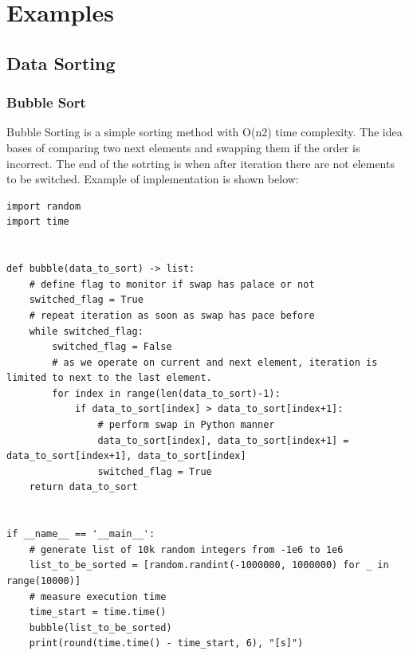 \documentclass{article}
\begin{document}
\newpage
\section{Examples}
\subsection{Data Sorting}
\subsubsection{Bubble Sort}
	Bubble Sorting is a simple sorting method with O(n2) time complexity. The idea bases of comparing two next elements and swapping them if the order is incorrect. The end of the sotrting is when after iteration there are not elements to be switched. Example of implementation is shown below:
\begin{lstlisting}[style=pystyle]
import random
import time


def bubble(data_to_sort) -> list:
    # define flag to monitor if swap has palace or not
    switched_flag = True
    # repeat iteration as soon as swap has pace before
    while switched_flag:
        switched_flag = False
        # as we operate on current and next element, iteration is limited to next to the last element.
        for index in range(len(data_to_sort)-1):
            if data_to_sort[index] > data_to_sort[index+1]:
                # perform swap in Python manner
                data_to_sort[index], data_to_sort[index+1] = data_to_sort[index+1], data_to_sort[index]
                switched_flag = True
    return data_to_sort


if __name__ == '__main__':
    # generate list of 10k random integers from -1e6 to 1e6
    list_to_be_sorted = [random.randint(-1000000, 1000000) for _ in range(10000)]
    # measure execution time
    time_start = time.time()
    bubble(list_to_be_sorted)
    print(round(time.time() - time_start, 6), "[s]")
\end{lstlisting}
\end{document}
